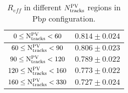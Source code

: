 \begin{table}[H]
\centering
\caption{$R_{eff}$ in different $N_{\rm tracks}^{\rm PV}$ regions in Pb$p$ configuration.}
\begin{center}
\begin{tabular}{c|c}
\hline
$0 \leq \mathrm{N_{\rm tracks}^{\rm PV}} < 60$ & $0.814 \pm 0.024$ \\
\hline
$60 \leq \mathrm{N_{\rm tracks}^{\rm PV}} < 90$ & $0.806 \pm 0.023$ \\
\hline
$90 \leq \mathrm{N_{\rm tracks}^{\rm PV}} < 120$ & $0.789 \pm 0.022$ \\
\hline
$120 \leq \mathrm{N_{\rm tracks}^{\rm PV}} < 160$ & $0.773 \pm 0.022$ \\
\hline
$160 \leq \mathrm{N_{\rm tracks}^{\rm PV}} < 330$ & $0.727 \pm 0.024$ \\
\hline
\end{tabular}
\end{center}
\label{ReffTable_PVN_Pbp}
\end{table}

